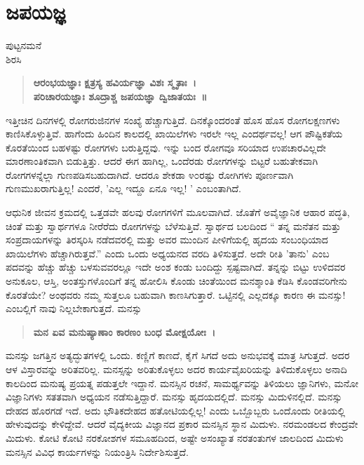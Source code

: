 \chapter{ಜಪಯಜ್ಞ}

\begin{center}
\smallskip
ಪುಟ್ಟನಮನೆ\\ 
ಶಿರಸಿ
\addrule
\end{center}

\begin{verse}
\textbf{ಆರಂಭಯಜ್ಞಾಃ ಕ್ಷತ್ರಸ್ಯ ಹವಿರ್ಯಜ್ಞಾ ವಿಶಃ ಸ್ಮೃತಾಃ~। \\
ಪರಿಚಾರಯಜ್ಞಾಃ ಶೂದ್ರಾಶ್ಚ ಜಪಯಜ್ಞಾ ದ್ವಿಜಾತಯಃ~॥}
\end{verse}
ಇತ್ತೀಚಿನ ದಿನಗಳಲ್ಲಿ ರೋಗರುಜಿನಗಳ ಸಂಖ್ಯೆ ಹೆಚ್ಚಾಗುತ್ತಿದೆ. ದಿನಕ್ಕೊಂದರಂತೆ ಹೊಸ ಹೊಸ ರೋಗಲಕ್ಷಣಗಳು ಕಾಣಿಸಿಕೊಳ್ಳುತ್ತಿವೆ. ಹಾಗೆಂದು ಹಿಂದಿನ ಕಾಲದಲ್ಲಿ ಖಾಯಿಲೆಗಳು ಇರಲೇ ಇಲ್ಲ ಎಂದರ್ಥವಲ್ಲ! ಆಗ ಪೌಷ್ಟಿಕತೆಯ ಕೊರತೆಯಿಂದ ಬಹಳಷ್ಟು ರೋಗಗಳು ಬರುತ್ತಿದ್ದವು. ಇನ್ನು ಬಂದ ರೋಗವೂ ಸರಿಯಾದ ಉಪಚಾರವಿಲ್ಲದೇ ಮಾರಣಾಂತಿಕವಾಗಿ ಬಿಡುತ್ತಿತ್ತು. ಆದರೆ ಈಗ ಹಾಗಿಲ್ಲ, ಒಂದೆರಡು ರೋಗಗಳನ್ನು ಬಿಟ್ಟರೆ ಬಹುತೇಕವಾಗಿ ರೋಗಗಳನ್ನೆಲ್ಲಾ ಗುಣಪಡಿಸಬಹುದಾಗಿದೆ. ಆದರೂ ಶೇಕಡಾ ೪೦ರಷ್ಟು ರೋಗಿಗಳು ಪೂರ್ಣವಾಗಿ ಗುಣಮುಖರಾಗುತ್ತಿಲ್ಲ! ಎಂದರೆ, ’ಎಲ್ಲ ಇದ್ದೂ ಏನೂ ಇಲ್ಲ! ’ ಎಂಬಂತಾಗಿದೆ.

ಆಧುನಿಕ ಜೀವನ ಕ್ರಮದಲ್ಲಿ ಒತ್ತಡವೇ ಹಲವು ರೋಗಗಳಿಗೆ ಮೂಲವಾಗಿದೆ. ಜೊತೆಗೆ ಅವೈಜ್ಞಾನಿಕ ಆಹಾರ ಪದ್ಧತಿ, ಚಿಂತೆ ಮತ್ತು ಸ್ವಾರ್ಥಗಳೂ ನೀರೆರೆದು ರೋಗಗಳನ್ನು ಬೆಳೆಸುತ್ತಿವೆ. ಸ್ವಾರ್ಥದ ಬಲದಿಂದ “ ತನ್ನ ಮನೆತನ ಮತ್ತು ಸಂಪ್ರದಾಯಗಳನ್ನು ತಿರಸ್ಕರಿಸಿ ನಡೆದವರಲ್ಲಿ ಮತ್ತು ಅವರ ಮುಂದಿನ ಪೀಳಿಗೆಯಲ್ಲಿ ಹೃದಯ ಸಂಬಂಧಿಯಾದ ಖಾಯಿಲೆಗಳು ಹೆಚ್ಚಾಗಿರುತ್ತವೆ.” ಎಂದು ಒಂದು ಅಧ್ಯಯನದ ವರದಿ ತಿಳಿಸುತ್ತದೆ. ಅದೇ ರೀತಿ ’ತಾನು’ ಎಂಬ ಪದವನ್ನು ಹೆಚ್ಚು ಹೆಚ್ಚು ಬಳಸುವವರಲ್ಲೂ ಇದೇ ಅಂಶ ಕಂಡು ಬಂದಿದ್ದು ಸ್ಪಷ್ಟವಾಗಿದೆ. ತನ್ನನ್ನು ಬಿಟ್ಟು ಉಳಿದವರ ಅನುಕೂಲ, ಆಸ್ತಿ, ಅಂತಸ್ತುಗಳೊಂದಿಗೆ ತನ್ನ ಹೋಲಿಸಿ ಕೊಂಡು ಚಿಂತೆಯಿಂದ ಮನಶ್ಶಾಂತಿ ಕೆಡಿಸಿ ಕೊಂಡವರಿಗೇನು ಕೊರತೆಯೇ? ಅಂಥವರು ನಮ್ಮ ಸುತ್ತಲೂ ಬಹುವಾಗಿ ಕಾಣಸಿಗುತ್ತಾರೆ. ಒಟ್ಟಿನಲ್ಲಿ ಎಲ್ಲದಕ್ಕೂ ಕಾರಣ ಈ ಮನಸ್ಸು! ಎಂಬಲ್ಲಿಗೆ ನಾವು ನಿಲ್ಲಬೇಕಾಗುತ್ತದೆ. ಮನಸ್ಸು
\begin{verse}  
\textbf{ಮನ ಏವ ಮನುಷ್ಯಾಣಾಂ ಕಾರಣಂ ಬಂಧ ಮೋಕ್ಷಯೋಃ~। }
\end{verse}
ಮನಸ್ಸು ಜಗತ್ತಿನ ಅತ್ಯದ್ಭುತಗಳಲ್ಲಿ ಒಂದು. ಕಣ್ಣಿಗೆ ಕಾಣದೆ, ಕೈಗೆ ಸಿಗದೆ ಅದು ಅನುಭವಕ್ಕೆ ಮಾತ್ರ ಸಿಗುತ್ತದೆ. ಅದರ ಆಳ ವಿಸ್ತಾರವನ್ನು ಅರಿತವರಿಲ್ಲ. ಮನಸ್ಸನ್ನು ಅರಿತುಕೊಳ್ಳಲು ಅದರ ಕಾರ್ಯವೈಖರಿಯನ್ನು ತಿಳಿದುಕೊಳ್ಳಲು ಅನಾದಿ ಕಾಲದಿಂದ ಮನುಷ್ಯ ಪ್ರಯತ್ನ ಪಡುತ್ತಲೇ ಇದ್ದಾನೆ. ಮನಸ್ಸಿನ ರಚನೆ, ಸಾಮರ್ಥ್ಯವನ್ನು ತಿಳಿಯಲು ಜ್ಞಾನಿಗಳು, ಮನೋ ವಿಜ್ಞಾನಿಗಳು ಸತತವಾಗಿ ಅಧ್ಯಯನ ನಡೆಸುತ್ತಿದ್ದಾರೆ. ಮನಸ್ಸು ಹೃದಯದಲ್ಲಿದೆ. ಮನಸ್ಸು ಮಿದುಳಿನಲ್ಲಿದೆ. ಮನಸ್ಸು ದೇಹದ ಹೊರಗಡೆ ಇದೆ. ಅದು ಭೌತಿಕದೇಹದ ಹತೋಟಿಯಲ್ಲಿಲ್ಲ! ಎಂದು ಒಬ್ಬೊಬ್ಬರು ಒಂದೊಂದು ರೀತಿಯಲ್ಲಿ ಹೇಳುವುದನ್ನು ಕೇಳಿದ್ದೇವೆ. ಆದರೆ ವೈದ್ಯಕೀಯ ವಿಜ್ಞಾನದ ಪ್ರಕಾರ ಮನಸ್ಸಿನ ಸ್ಥಾನ ಮಿದುಳು. ನರಮಂಡಲದ ಕೇಂದ್ರವೇ ಮಿದುಳು. ಕೋಟಿ ಕೋಟಿ ನರಕೋಶಗಳ ಸಮೂಹದಿಂದ, ಅಷ್ಟೇ ಅಸಂಖ್ಯಾತ ನರತಂತುಗಳ ಜಾಲದಿಂದ ಮಿದುಳು ಮನಸ್ಸಿನ ವಿವಿಧ ಕಾರ್ಯಗಳನ್ನು ನಿಯಂತ್ರಿಸಿ ನಿರ್ದೇಶಿಸುತ್ತದೆ.

